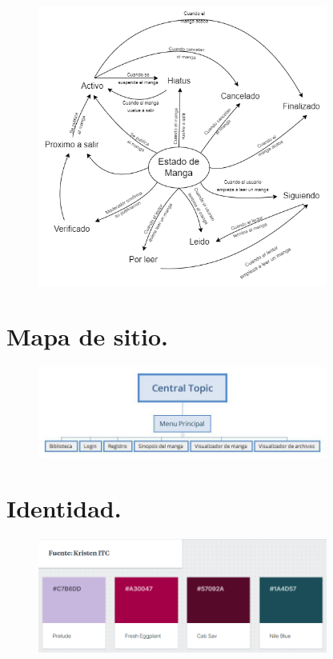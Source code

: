 \documentclass[12pt]{article}
\begin{document}
\begin{figure}[htbp]
	\centering
		\includegraphics[width=0.85\textwidth]{Diagrama_estado.png}
	\label{fig:Diagrama_estado}
\end{figure}

\newpage

\section{Mapa de sitio.}

\begin{figure}[htbp]
	\centering
		\includegraphics[width=0.85\textwidth]{mapa_sitio.jpg}
	\label{fig:mapa_sitio}
\end{figure}

\newpage

\section{Identidad.}

\begin{figure}[htbp]
	\centering
		\includegraphics[width=0.85\textwidth]{fuente_colores.png}
	\label{fig:fuente_colores}
\end{figure}
\end{document}
